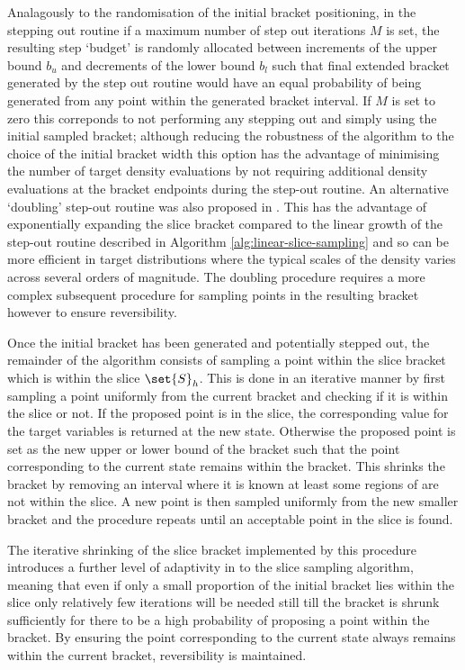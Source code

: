 Analagously to the randomisation of the initial bracket positioning, in the stepping out routine if a maximum number of step out iterations $M$ is set, the resulting step `budget' is randomly allocated between increments of the upper bound $b_u$ and decrements of the lower bound $b_l$ such that final extended bracket generated by the step out routine would have an equal probability of being generated from any point within the generated bracket interval. If $M$ is set to zero this correponds to not performing any stepping out and simply using the initial sampled bracket; although reducing the robustness of the algorithm to the choice of the initial bracket width this option has the advantage of minimising the number of target density evaluations by not requiring additional density evaluations at the bracket endpoints during the step-out routine. An alternative `doubling' step-out routine was also proposed in \citep{neal2003slice}. This has the advantage of exponentially expanding the slice bracket compared to the linear growth of the step-out routine described in Algorithm \ref{alg:linear-slice-sampling} and so can be more efficient in target distributions where the typical scales of the density varies across several orders of magnitude. The doubling procedure requires a more complex subsequent procedure for sampling points in the resulting bracket however to ensure reversibility. 

Once the initial bracket has been generated and potentially stepped out, the remainder of the algorithm consists of sampling a point within the slice bracket which is within the slice $\set{S}_h$. This is done in an iterative manner by first sampling a point uniformly from the current bracket and checking if it is within the slice or not. If the proposed point is in the slice, the corresponding value for the target variables is returned at the new state. Otherwise the proposed point is set as the new upper or lower bound of the bracket such that the point corresponding to the current state remains within the bracket. This shrinks the bracket by removing an interval where it is known at least some regions of are not within the slice. A new point is then sampled uniformly from the new smaller bracket and the procedure repeats until an acceptable point in the slice is found.

The iterative shrinking of the slice bracket implemented by this procedure introduces a further level of adaptivity in to the slice sampling algorithm, meaning that even if only a small proportion of the initial bracket lies within the slice only relatively few iterations will be needed still till the bracket is shrunk sufficiently for there to be a high probability of proposing a point within the bracket. By ensuring the point corresponding to the current state always remains within the current bracket, reversibility is maintained.

